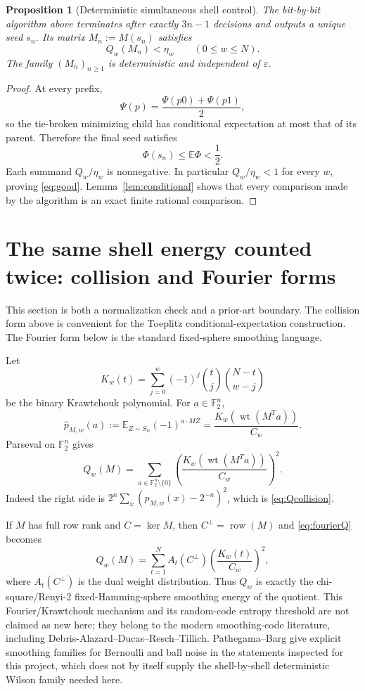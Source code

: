 \documentclass[11pt]{article}
\newtheorem{proposition}[theorem]{Proposition}
\newcommand{\F}{\mathbb F}
\newcommand{\1}{\mathbf 1}
\newcommand{\wt}{\operatorname{wt}}
\newcommand{\E}{\mathbb E}
\begin{document}
\begin{proposition}[Deterministic simultaneous shell control]\label{prop:det}
The bit-by-bit algorithm above terminates after exactly $3n-1$ decisions and outputs a unique seed $s_n$.  Its matrix $M_n:=M(s_n)$ satisfies
\begin{equation}\label{eq:good}
 Q_w(M_n)<\eta_w\qquad(0\le w\le N).
\end{equation}
The family $(M_n)_{n\ge1}$ is deterministic and independent of $\varepsilon$.
\end{proposition}

\begin{proof}
At every prefix,
\[
 \Psi(p)=\frac{\Psi(p0)+\Psi(p1)}2,
\]
so the tie-broken minimizing child has conditional expectation at most that of its parent.  Therefore the final seed satisfies
\[
 \Phi(s_n)\le\E\Phi<\frac12.
\]
Each summand $Q_w/\eta_w$ is nonnegative.  In particular $Q_w/\eta_w<1$ for every $w$, proving \eqref{eq:good}.  Lemma~\ref{lem:conditional} shows that every comparison made by the algorithm is an exact finite rational comparison.
\end{proof}

\section{The same shell energy counted twice: collision and Fourier forms}

This section is both a normalization check and a prior-art boundary.  The collision form above is convenient for the Toeplitz conditional-expectation construction.  The Fourier form below is the standard fixed-sphere smoothing language.

Let
\[
 K_w(t)=\sum_{j=0}^w(-1)^j\binom tj\binom{N-t}{w-j}
\]
be the binary Krawtchouk polynomial.  For $a\in\F_2^n$,
\[
 \widehat p_{M,w}(a)
 :=\E_{Z\sim S_w}(-1)^{a\cdot MZ}
 =\frac{K_w(\wt(M^Ta))}{C_w}.
\]
Parseval on $\F_2^n$ gives
\begin{equation}\label{eq:fourierQ}
 Q_w(M)
 =\sum_{a\in\F_2^n\setminus\{0\}}
   \left(\frac{K_w(\wt(M^Ta))}{C_w}\right)^2.
\end{equation}
Indeed the right side is $2^n\sum_x(p_{M,w}(x)-2^{-n})^2$, which is \eqref{eq:Qcollision}.

If $M$ has full row rank and $C=\ker M$, then $C^\perp=\operatorname{row}(M)$ and \eqref{eq:fourierQ} becomes
\[
 Q_w(M)=\sum_{t=1}^N A_t(C^\perp)\left(\frac{K_w(t)}{C_w}\right)^2,
\]
where $A_t(C^\perp)$ is the dual weight distribution.  Thus $Q_w$ is exactly the chi-square/Renyi-2 fixed-Hamming-sphere smoothing energy of the quotient.  This Fourier/Krawtchouk mechanism and its random-code entropy threshold are not claimed as new here; they belong to the modern smoothing-code literature, including Debris-Alazard--Ducas--Resch--Tillich.  Pathegama--Barg give explicit smoothing families for Bernoulli and ball noise in the statements inspected for this project, which does not by itself supply the shell-by-shell deterministic Wilson family needed here.
\end{document}
